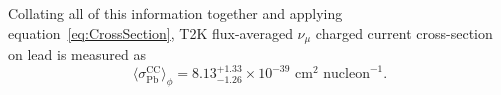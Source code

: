 \newline
\newline
Collating all of this information together and applying equation~\ref{eq:CrossSection},  T2K flux-averaged $\nu_\mu$ charged current cross-section on lead is measured as 
\begin{equation}
\langle \sigma^{\textrm{CC}}_{\textrm{Pb}} \rangle_{\phi} = 8.13^{+1.33}_{-1.26} \times 10^{-39} \textrm{ cm}^2 \textrm{ nucleon}^{-1}.
\end{equation}






